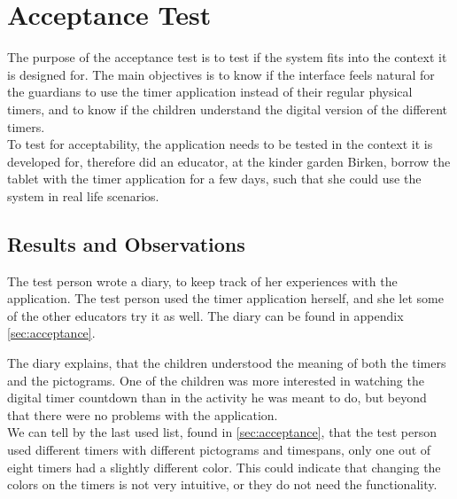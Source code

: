 \section{Acceptance Test}
\label{sec:accept_test}
The purpose of the acceptance test\cite{misc:designInterSys} is to test if the system fits into the context it is designed for. 
The main objectives is to know if the interface feels natural for the guardians to use the timer application instead of their regular physical timers, and to know if the children understand the digital version of the different timers.\\

To test for acceptability, the application needs to be tested in the context it is developed for, therefore did an educator, at the kinder garden Birken, borrow the tablet with the timer application for a few days, such that she could use the system in real life scenarios. 

\subsection{Results and Observations}
The test person wrote a diary, to keep track of her experiences with the application. The test person used the timer application herself, and she let some of the other educators try it as well. The diary can be found in appendix \ref{sec:acceptance}.

The diary explains, that the children understood the meaning of both the timers and the pictograms. One of the children was more interested in watching the digital timer countdown than in the activity he was meant to do, but beyond that there were no problems with the application.\\

We can tell by the last used list, found in \autoref{sec:acceptance}, that the test person used different timers with different pictograms and timespans, only one out of eight timers had a slightly different color. This could indicate that changing the colors on the timers is not very intuitive, or they do not need the functionality.